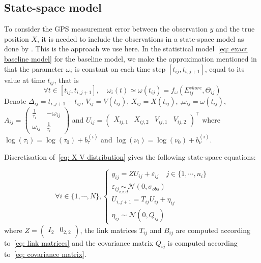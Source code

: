 \documentclass[11pt]{article}
\newcommand {\1}{\mathbb{1}}
\theoremstyle{definition}
\theoremstyle{remark}
\theoremstyle{remark}
\begin{document}
\subsection{State-space model}
\label{section: state space model}
To consider the GPS measurement error between the observation $y$ and the true position $X$, it is needed to include the observations in a state-space model as done by \cite{johnson_continuoustime_2008}. This is the approach we use here. In the statistical model~\eqref{eq: exact baseline model} for the baseline model, we make the approximation mentioned in \cite{michelot_varying-coefficient_2021} that the parameter $\omega_i$ is constant on each time step $[t_{ij},t_{i,j+1}]$, equal to its value at time $t_{ij}$, that is 
\[\forall t \in [t_{ij},t_{i,j+1}], \quad \omega_{i}(t) \simeq \omega(t_{ij})= f_{\omega}(E^{shore}_{ij},\Theta_{ij})\]
 Denote $\Delta_{ij}=t_{i,j+1}-t_{ij}$, $V_{ij}=V(t_{ij})$, $X_{ij}=X(t_{ij})$, ,$\omega_{ij}=\omega(t_{ij})$, $A_{ij}=\begin{pmatrix} 
	\frac{1}{\tau_{i}} & -\omega_{ij} \\
	\omega_{ij} & \frac{1}{\tau_{i}}
\end{pmatrix}$ and $U_{ij}=\begin{pmatrix} X_{ij,1}  & X_{ij,2} & V_{ij,1} & V_{ij,2}\end{pmatrix}^\top$ where $\log(\tau_i)=\log(\tau_0)+b_{\tau}^{(i)}$ and $\log(\nu_i)=\log(\nu_0)+b_{\nu}^{(i)}$.

Discretisation of~\eqref{eq: X V distribution} gives the following state-space equations:

\begin{equation}
	\forall i \in \{1,\cdots,N\}, \left\{
	\begin{array}{l}
		y_{ij}=ZU_{ij}+\varepsilon_{ij} \quad j \in \{1,\cdots,n_i\}\\
		\varepsilon_{ij} \underset{i.i.d}{\sim} \mathcal{N}(0,\sigma_{obs}) \\
		U_{i,j+1}=T_{ij} U_{ij} + \eta_{ij} \\
		\eta_{ij} \sim \mathcal{N}(0,Q_{ij})
	\end{array}
	\right.
	\label{eq: RACVM state space}
\end{equation}
where $Z=\begin{pmatrix} I_2 & 0_{2,2}\end{pmatrix}$, the link matrices $T_{ij}$ and $B_{ij}$ are computed according to~\eqref{eq: link matrices} and the covariance matrix $Q_{ij}$ is computed according to~\eqref{eq: covariance matrix}.
\\
\end{document}
